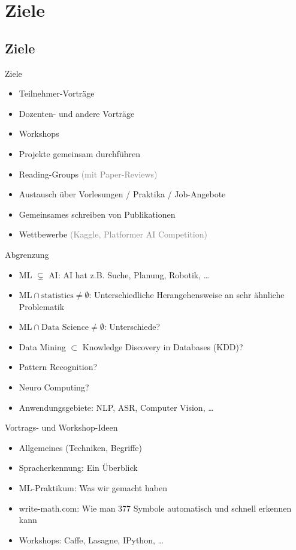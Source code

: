 \section{Ziele}
\subsection*{Ziele}

\begin{frame}{Ziele}
    \begin{itemize}
        \item Teilnehmer-Vorträge
        \item Dozenten- und andere Vorträge
        \item Workshops
        \item Projekte gemeinsam durchführen
        \item Reading-Groups \textcolor{gray}{(mit Paper-Reviews)}
        \item Austausch über Vorlesungen / Praktika / Job-Angebote
        \item Gemeinsames schreiben von Publikationen
        \item Wettbewerbe \textcolor{gray}{(Kaggle, Platformer AI Competition)}
    \end{itemize}
\end{frame}

\begin{frame}{Abgrenzung}
    \begin{itemize}
        \item ML $\subsetneq$ AI: AI hat z.B. Suche, Planung, Robotik, \dots
        \item $\text{ML} \cap \text{statistics} \neq \emptyset$:
              Unterschiedliche Herangehensweise an sehr ähnliche Problematik
        \item $\text{ML} \cap \text{Data Science} \neq \emptyset$: Unterschiede?
        \item Data Mining $\subset$ Knowledge Discovery in Databases (KDD)?
        \item Pattern Recognition?
        \item Neuro Computing?
        \item Anwendungsgebiete: NLP, ASR, Computer Vision, \dots
    \end{itemize}
\end{frame}

\begin{frame}{Vortrags- und Workshop-Ideen}
    \begin{itemize}
        \item Allgemeines (Techniken, Begriffe)
        \item Spracherkennung: Ein Überblick
        \item ML-Praktikum: Was wir gemacht haben
        \item write-math.com: Wie man 377 Symbole automatisch und schnell
              erkennen kann
        \item Workshops: Caffe, Lasagne, IPython, \dots
    \end{itemize}
\end{frame}
